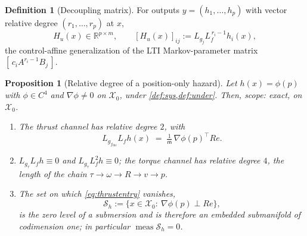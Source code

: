 \documentclass[11pt]{article}
\theoremstyle{plain}
\newtheorem{proposition}[theorem]{Proposition}
\theoremstyle{definition}
\newtheorem{definition}[theorem]{Definition}
\theoremstyle{remark}
\newcommand{\R}{\mathbb{R}}
\newcommand{\calX}{\mathcal{X}}
\newcommand{\mass}{\mathsf m}
\newcommand{\Lf}{L_f}
\newcommand{\grad}{\nabla}
\newcommand{\Hu}{H_u}
\newcommand{\eqdef}{:=}
\begin{document}
\begin{definition}[Decoupling matrix]\label{def:hu}
For outputs $y=(h_1,\dots,h_p)$ with vector relative degree $(r_1,\dots,r_p)$ at $x$,
\begin{equation}
\Hu(x)\in\R^{p\times m},\qquad [\Hu(x)]_{ij}\eqdef L_{g_j}\Lf^{\,r_i-1}h_i(x),
\end{equation}
the control-affine generalization of the LTI Markov-parameter matrix $[\,c_iA^{r_i-1}B_j\,]$.
\end{definition}

\begin{proposition}[Relative degree of a position-only hazard]\label{prop:relh}
Let $h(x)=\phi(p)$ with $\phi\in C^4$ and $\grad\phi\neq0$ on $\calX_0$, under
\cref{def:sys,def:under}. Then, scope: exact, on $\calX_0$.
\begin{enumerate}[label=(\alph*)]
  \item The thrust channel has relative degree $2$, with
  \begin{equation}\label{eq:thrustentry}
  L_{g_{f_{\mathrm{thr}}}}\Lf h(x)\;=\;\tfrac1{\mass}\,\grad\phi(p)^\top R e .
  \end{equation}
  \item $L_{g_\tau}\Lf h\equiv0$ and $L_{g_\tau}\Lf^{2}h\equiv0$; the torque channel has
  relative degree $4$, the length of the chain $\tau\to\omega\to R\to v\to p$.
  \item The set on which \cref{eq:thrustentry} vanishes,
  \begin{equation}
  \mathcal S_h\eqdef\{x\in\calX_0:\ \grad\phi(p)\perp Re\},
  \end{equation}
  is the zero level of a submersion and is therefore an embedded submanifold of codimension
  one; in particular $\operatorname{meas}\mathcal S_h=0$.
\end{enumerate}
\end{proposition}
\end{document}
